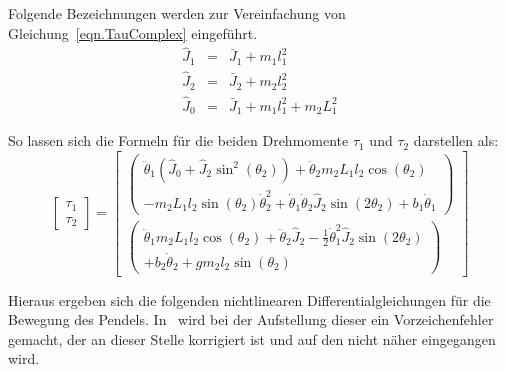 Folgende Bezeichnungen werden zur Vereinfachung von Gleichung~\ref{eqn.TauComplex} eingeführt.
\begin{eqnarray}
\hat{J}_1 &=& \bar{J}_1 + m_1l^2_1	\nonumber	\\
\hat{J}_2 &=& \bar{J}_2 + m_2l^2_2	\nonumber	\\
\hat{J}_0 &=& \bar{J}_1 + m_1l^2_1 + m_2L^2_1
\end{eqnarray}

So lassen sich die Formeln für die beiden Drehmomente $\tau_1$ und $\tau_2$ darstellen als:
\begin{equation}
\begin{bmatrix}
\tau_1 \\
\tau_2
\end{bmatrix}
=
\begin{bmatrix}
\begin{pmatrix}
\ddot{\theta}_1(\hat{J}_0+\hat{J}_2\sin^2(\theta_2))+\ddot{\theta}_2m_2L_1l_2\cos(\theta_2)			\\
-m_2L_1l_2\sin(\theta_2)\dot{\theta}^2_2+\dot{\theta}_1\dot{\theta}_2\hat{J}_2\sin(2\theta_2)+b_1\dot{\theta}_1
\end{pmatrix}
\\
\begin{pmatrix}
\ddot{\theta}_1m_2L_1l_2\cos(\theta_2)+\ddot{\theta}_2\hat{J}_2-\frac{1}{2}\dot{\theta}^2_1\hat{J}_2\sin(2\theta_2)						\\
+b_2\dot{\theta}_2+gm_2l_2\sin(\theta_2)
\end{pmatrix}
\end{bmatrix}
\end{equation}

Hieraus ergeben sich die folgenden nichtlinearen Differentialgleichungen für die Bewegung des Pendels. 
In~\cite{Cazzolato.2011} wird bei der Aufstellung dieser ein Vorzeichenfehler gemacht, der an dieser Stelle korrigiert ist und auf den nicht näher eingegangen wird.


